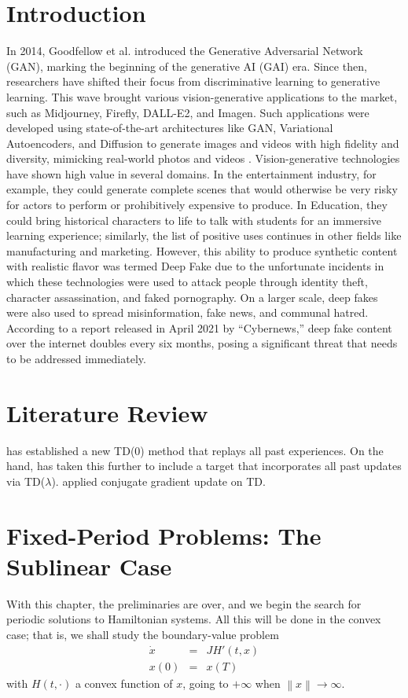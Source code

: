 \documentclass{svproc}
\begin{document}
\section{Introduction}
    In 2014, Goodfellow et al. introduced the Generative Adversarial Network (GAN), marking the beginning of the generative AI (GAI) era. Since then, researchers have shifted their focus from discriminative learning to generative learning. This wave brought various vision-generative applications to the market, such as Midjourney, Firefly, DALL-E2, and Imagen\cite {bengesi2024advancements}. Such applications were developed using state-of-the-art architectures like GAN, Variational Autoencoders, and Diffusion to generate images and videos with high fidelity and diversity, mimicking real-world photos and videos \cite {raut2024generative}. 
Vision-generative technologies have shown high value in several domains. In the entertainment industry, for example, they could generate complete scenes that would otherwise be very risky for actors to perform or prohibitively expensive to produce. In Education, they could bring historical characters to life to talk with students for an immersive learning experience; similarly, the list of positive uses continues in other fields like manufacturing and marketing. However, this ability to produce synthetic content with realistic flavor was termed Deep Fake due to the unfortunate incidents in which these technologies were used to attack people through identity theft, character assassination, and faked pornography. On a larger scale, deep fakes were also used to spread misinformation, fake news, and communal hatred. According to a report released in April 2021 by “Cybernews,” deep fake content over the internet doubles every six months, posing a significant threat that needs to be addressed immediately\cite {patel2023deepfake}.

\section{Literature Review}
    \cite{TD0-Replay} has established a new TD(0) method that replays all past experiences. On the hand, \cite{TD-Replay} has taken this further to include a target that incorporates all past updates via TD($\lambda$). \cite{ConjugateTD} applied conjugate gradient update on TD.

    


\section{Fixed-Period Problems: The Sublinear Case}
%
With this chapter, the preliminaries are over, and we begin the search
for periodic solutions to Hamiltonian systems. All this will be done in
the convex case; that is, we shall study the boundary-value problem
\begin{eqnarray*}
  \dot{x}&=&JH' (t,x)\\
  x(0) &=& x(T)
\end{eqnarray*}
with $H(t,\cdot)$ a convex function of $x$, going to $+\infty$ when
$\left\|x\right\| \to \infty$.
\end{document}
